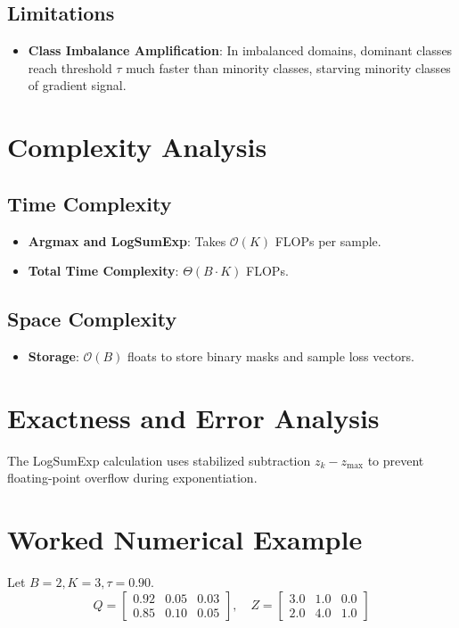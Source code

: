 \documentclass[11pt,a4paper]{article}
\theoremstyle{definition}
\begin{document}
\subsection{Limitations}
\begin{itemize}
    \item \textbf{Class Imbalance Amplification}: In imbalanced domains, dominant classes reach threshold $\tau$ much faster than minority classes, starving minority classes of gradient signal.
\end{itemize}

\section{Complexity Analysis}

\subsection{Time Complexity}
\begin{itemize}
    \item \textbf{Argmax and LogSumExp}: Takes $\mathcal{O}(K)$ FLOPs per sample.
    \item \textbf{Total Time Complexity}: $\Theta(B \cdot K)$ FLOPs.
\end{itemize}

\subsection{Space Complexity}
\begin{itemize}
    \item \textbf{Storage}: $\mathcal{O}(B)$ floats to store binary masks and sample loss vectors.
\end{itemize}

\section{Exactness and Error Analysis}

The LogSumExp calculation uses stabilized subtraction $z_k - z_{\text{max}}$ to prevent floating-point overflow during exponentiation.

\section{Worked Numerical Example}

Let $B = 2, K = 3, \tau = 0.90$.
\begin{equation}
Q = \begin{bmatrix} 0.92 & 0.05 & 0.03 \\ 0.85 & 0.10 & 0.05 \end{bmatrix}, \quad Z = \begin{bmatrix} 3.0 & 1.0 & 0.0 \\ 2.0 & 4.0 & 1.0 \end{bmatrix}
\end{equation}
\end{document}
